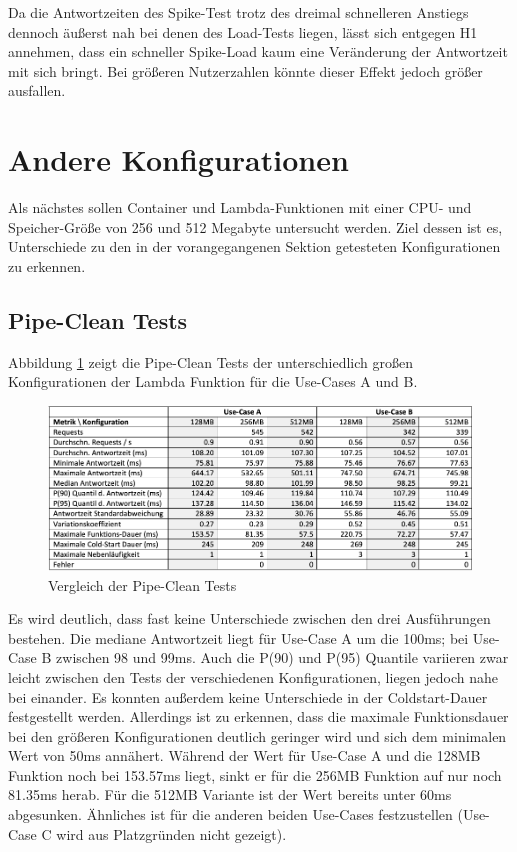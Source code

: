 Da die Antwortzeiten des Spike-Test trotz des dreimal schnelleren Anstiegs dennoch äußerst nah bei denen des Load-Tests liegen, lässt sich entgegen H1 annehmen, dass ein schneller Spike-Load kaum eine Veränderung der Antwortzeit mit sich bringt. Bei größeren Nutzerzahlen könnte dieser Effekt jedoch größer ausfallen.


\section{Andere Konfigurationen}
Als nächstes sollen Container und Lambda-Funktionen mit einer CPU- und Speicher-Größe von 256 und 512 Megabyte untersucht werden. Ziel dessen ist es, Unterschiede zu den in der vorangegangenen Sektion getesteten Konfigurationen zu erkennen.

\subsection{Pipe-Clean Tests}
Abbildung \ref{fig:pipe-comparison} zeigt die Pipe-Clean Tests der unterschiedlich großen Konfigurationen der Lambda Funktion für die Use-Cases A und B.

\begin{figure}[H]
    \includegraphics[width=\textwidth]{img/pipe-comparison.png}
    \caption[Vergleich der Pipe-Clean Tests]{Vergleich der Pipe-Clean Tests}
    \label{fig:pipe-comparison}
\end{figure}

Es wird deutlich, dass fast keine Unterschiede zwischen den drei Ausführungen bestehen. Die mediane Antwortzeit liegt für Use-Case A um die 100ms; bei Use-Case B zwischen 98 und 99ms. Auch die P(90) und P(95) Quantile variieren zwar leicht zwischen den Tests der verschiedenen Konfigurationen, liegen jedoch nahe bei einander. Es konnten außerdem keine Unterschiede in der Coldstart-Dauer festgestellt werden. 
Allerdings ist zu erkennen, dass die maximale Funktionsdauer bei den größeren Konfigurationen deutlich geringer wird und sich dem minimalen Wert von 50ms annähert. Während der Wert für Use-Case A und die 128MB Funktion noch bei 153.57ms liegt, sinkt er für die 256MB Funktion auf nur noch 81.35ms herab. Für die 512MB Variante ist der Wert bereits unter 60ms abgesunken. Ähnliches ist für die anderen beiden Use-Cases festzustellen (Use-Case C wird aus Platzgründen nicht gezeigt).

